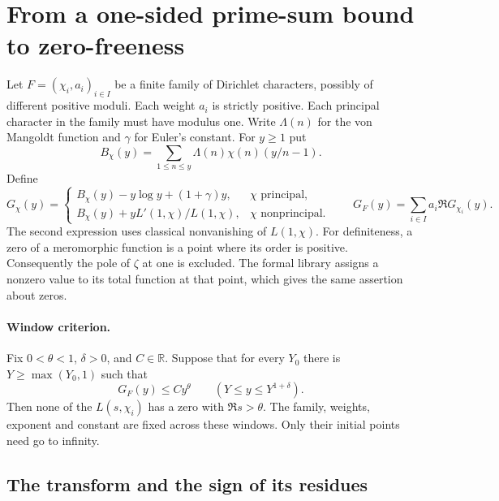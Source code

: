 \section{From a one-sided prime-sum bound to zero-freeness}
\label{sec:window-analysis}

Let \(F=(\chi_i,a_i)_{i\in I}\) be a finite family of Dirichlet
characters, possibly of different positive moduli. Each weight \(a_i\)
is strictly positive. Each principal character in the family must have
modulus one. Write \(\Lambda(n)\) for the von Mangoldt function and
\(\gamma\) for Euler's constant. For \(y\geq1\) put
\[
 B_\chi(y)=\sum_{1\leq n\leq y}\Lambda(n)\chi(n)(y/n-1).
\]
Define
\[
 G_\chi(y)=
 \begin{cases}
 B_\chi(y)-y\log y+(1+\gamma)y,&\chi\text{ principal},\\
 B_\chi(y)+yL'(1,\chi)/L(1,\chi),&\chi\text{ nonprincipal}.
 \end{cases}
 \qquad G_F(y)=\sum_{i\in I}a_i\Re G_{\chi_i}(y).
\]
The second expression uses classical nonvanishing of \(L(1,\chi)\).
For definiteness, a zero of a meromorphic function is a point where its
order is positive. Consequently the pole of \(\zeta\) at one is excluded.
The formal library assigns a nonzero value to its total function at that
point, which gives the same assertion about zeros.

\paragraph{Window criterion.}
Fix \(0<\theta<1\), \(\delta>0\), and \(C\in\mathbb R\). Suppose that
for every \(Y_0\) there is \(Y\geq\max(Y_0,1)\) such that
\begin{equation}
 G_F(y)\leq C y^\theta\qquad(Y\leq y\leq Y^{1+\delta}).
 \label{eq:an-window}
\end{equation}
Then none of the \(L(s,\chi_i)\) has a zero with \(\Re s>\theta\).
The family, weights, exponent and constant are fixed across these
windows. Only their initial points need go to infinity.

\subsection{The transform and the sign of its residues}

